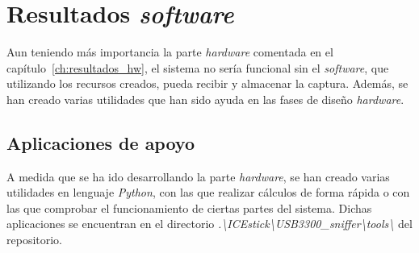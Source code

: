 \chapter{Resultados \emph{software}}
\label{ch:resultados_sw}

Aun teniendo más importancia la parte \emph{hardware} comentada en el capítulo~\ref{ch:resultados_hw}, el sistema no sería funcional sin el \emph{software}, que utilizando los recursos creados, pueda recibir y almacenar la captura. Además, se han creado varias utilidades que han sido ayuda en las fases de diseño \emph{hardware}.

\section{Aplicaciones de apoyo}
A medida que se ha ido desarrollando la parte \emph{hardware}, se han creado varias utilidades en lenguaje \emph{Python}, con las que realizar cálculos de forma rápida o con las que comprobar el funcionamiento de ciertas partes del sistema. Dichas aplicaciones se encuentran en el directorio \emph{.\textbackslash ICEstick\textbackslash USB3300\_sniffer\textbackslash tools\textbackslash} del repositorio.

